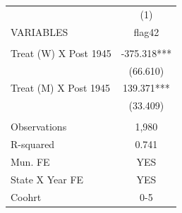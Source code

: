 \begin{tabular}{lc} \hline
 & (1) \\
VARIABLES & flag42 \\ \hline
 &  \\
Treat (W) X Post 1945 & -375.318*** \\
 & (66.610) \\
Treat (M) X Post 1945 & 139.371*** \\
 & (33.409) \\
 &  \\
Observations & 1,980 \\
R-squared & 0.741 \\
Mun. FE & YES \\
State X Year FE & YES \\
 Coohrt & 0-5 \\ \hline
\end{tabular}

